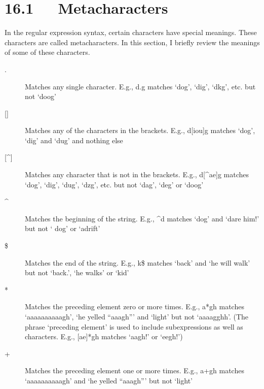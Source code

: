 \documentclass[letterpaper,10pt,english]{sphinxmanual}
\begin{document}
\section{16.1   Metacharacters}
\label{user_guide:metacharacters}
In the regular expression syntax, certain characters have special meanings.
These characters are called metacharacters.  In this section, I briefly review
the meanings of some of these characters.
\begin{description}
\item[{.}] \leavevmode
Matches any single character.  E.g., d.g matches `dog', `dig', `dkg', etc.
but not `doog'

\item[{{[}{]}}] \leavevmode
Matches any of the characters in the brackets.  E.g., d{[}iou{]}g matches `dog',
`dig' and `dug' and nothing else

\item[{{[}\textasciicircum{}{]}}] \leavevmode
Matches any character that is not in the brackets.  E.g., d{[}\textasciicircum{}ae{]}g matches
`dog', `dig', `dug', `dzg', etc. but not `dag', `deg' or `doog'

\end{description}
\begin{description}
\item[{\textasciicircum{}}] \leavevmode
Matches the beginning of the string.  E.g., \textasciicircum{}d matches `dog' and `dare him!'
but not ` dog' or `adrift'

\end{description}
\begin{description}
\item[{\$}] \leavevmode
Matches the end of the string.  E.g., k\$ matches `back' and `he will walk'
but not `back.', `he walks' or `kid'

\item[{*}] \leavevmode
Matches the preceding element zero or more times.  E.g., a*gh matches
`aaaaaaaaaagh', `he yelled ``aaagh''' and `light' but not `aaaagghh'.  (The
phrase `preceding element' is used to include subexpressions as well as
characters.  E.g., {[}ae{]}*gh matches `aagh!' or `eegh!')

\item[{+}] \leavevmode
Matches the preceding element one or more times.  E.g., a+gh matches
`aaaaaaaaaagh' and `he yelled ``aaagh''' but not `light'

\end{description}
\end{document}
